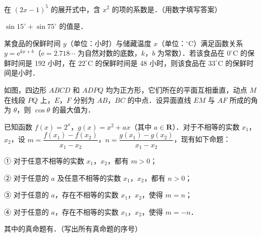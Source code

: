 \begin{question}
在 \((2x-1)^5\) 的展开式中，含 \(x^2\) 的项的系数是\gkblank{}．（用数字填写答案）

\end{question}
\begin{question}
\(\sin 15^{\circ}+\sin 75^{\circ}\) 的值是\gkblank{}．

\end{question}
\begin{question}
某食品的保鲜时间 \(y\)（单位：小时）与储藏温度 \(x\)（单位：\(^{\circ}\mathrm{C}\)）满足函数关系 \(y=\mathrm{e}^{kx+b}\)（\(\mathrm{e}=2.718\cdots\) 为自然对数的底数，\(k\)，\(b\) 为常数）．若该食品在 \(0^{\circ}\mathrm{C}\) 的保鲜时间是 192 小时，在 \(22^{\circ}\mathrm{C}\) 的保鲜时间是 48 小时，则该食品在 \(33^{\circ}\mathrm{C}\) 的保鲜时间是\gkblank{}小时．

\Needspace{0.4\textheight}
\end{question}
\begin{question}
如图，四边形 \(ABCD\) 和 \(ADPQ\) 均为正方形，它们所在的平面互相垂直，动点 \(M\) 在线段 \(PQ\) 上，\(E\)，\(F\) 分别为 \(AB\)，\(BC\) 的中点．设异面直线 \(EM\) 与 \(AF\) 所成的角为 \(\theta\)，则 \(\cos\theta\) 的最大值为\gkblank{}．
\nopagebreak[4]
\begin{center}\end{center}
\nopagebreak[4]
\end{question}
\begin{question}
已知函数 \(f(x)=2^x\)，\(g(x)=x^2+ax\)（其中 \(a\in\mathbf{R}\)）．对于不相等的实数 \(x_1\)，\(x_2\)，设 \(m=\dfrac{f(x_1)-f(x_2)}{x_1-x_2}\)，\(n=\dfrac{g(x_1)-g(x_2)}{x_1-x_2}\)，现有如下命题：

① 对于任意不相等的实数 \(x_1\)，\(x_2\)，都有 \(m>0\)；

② 对于任意的 \(a\) 及任意不相等的实数 \(x_1\)，\(x_2\)，都有 \(n>0\)；

③ 对于任意的 \(a\)，存在不相等的实数 \(x_1\)，\(x_2\)，使得 \(m=n\)；

④ 对于任意的 \(a\)，存在不相等的实数 \(x_1\)，\(x_2\)，使得 \(m=-n\)．

其中的真命题有\gkblank{}．（写出所有真命题的序号）

\end{question}

